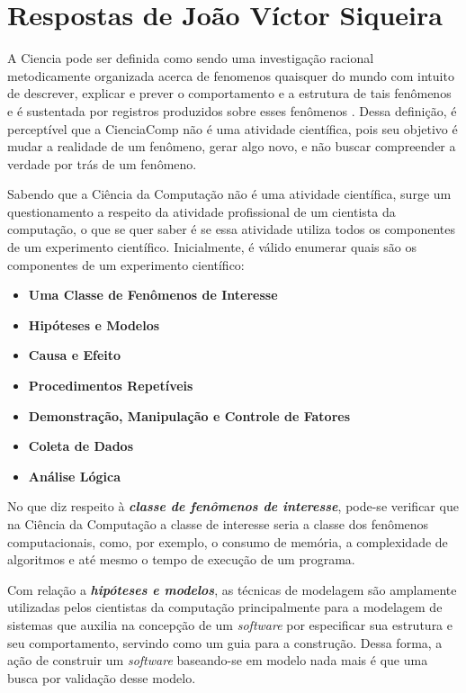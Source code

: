 \section{Respostas de João Víctor Siqueira}

A \gls{Ciencia} pode ser definida como sendo uma investigação racional metodicamente organizada acerca de \gls{fenomeno}s quaisquer do mundo com intuito de descrever, explicar e prever o comportamento e a estrutura de tais fenômenos e é sustentada por registros produzidos sobre esses fenômenos \citep{fernandes_consideracoes_2021}. Dessa definição, é perceptível que a \gls{CienciaComp} não é uma atividade científica, pois seu objetivo é mudar a realidade de um fenômeno, gerar algo novo, e não buscar compreender a verdade por trás de um fenômeno.

Sabendo que a Ciência da Computação não é uma atividade científica, surge um questionamento a respeito da atividade profissional de um cientista da computação, o que se quer saber é se essa atividade utiliza todos os componentes de um experimento científico. Inicialmente, é válido enumerar quais são os componentes de um experimento científico: 

\begin{itemize}
    \item \textbf{Uma Classe de Fenômenos de Interesse}
    \item \textbf{Hipóteses e Modelos}
    \item \textbf{Causa e Efeito}
    \item \textbf{Procedimentos Repetíveis}
    \item \textbf{Demonstração, Manipulação e Controle de \gls{Fatores}}
    \item \textbf{Coleta de Dados}
    \item \textbf{Análise Lógica}
\end{itemize}

No que diz respeito à \textbf{\textit{classe de fenômenos de interesse}}, pode-se verificar que na Ciência da Computação a classe de interesse seria a classe dos fenômenos computacionais, como, por exemplo, o consumo de memória, a complexidade de algoritmos e até mesmo o tempo de execução de um programa.

Com relação a \textbf{\textit{hipóteses e modelos}}, as técnicas de modelagem são amplamente utilizadas pelos cientistas da computação principalmente para a modelagem de sistemas que auxilia na concepção de um \textit{software} por especificar sua estrutura e seu comportamento, servindo como um guia para a construção. Dessa forma, a ação de construir um \textit{software} baseando-se em modelo nada mais é que uma busca por validação desse modelo.

